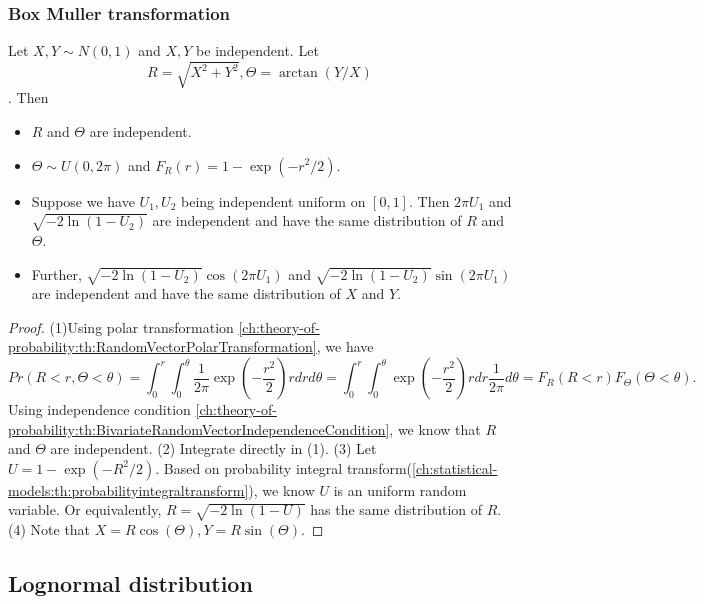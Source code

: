 \begin{refsection}
\subsubsection{Box Muller transformation}

\begin{lemma}\label{ch:theory-of-statistics:th:BoxMullerTransformation}
Let $X,Y\sim N(0,1)$ and $X,Y$ be independent. Let $$R=\sqrt{X^2+Y^2}, \Theta = \arctan(Y/X)$$. Then 
\begin{itemize}
	\item $R$ and $\Theta$ are independent.
	\item $\Theta \sim U(0,2\pi)$ and $F_R(r) = 1 - \exp(-r^2/2)$.
	\item Suppose we have $U_1,U_2$ being independent uniform on $[0,1]$. Then
	$2\pi U_1$ and $\sqrt{-2\ln(1-U_2)}$ are independent and have the same distribution of $R$ and $\Theta$.
	\item Further, $\sqrt{-2\ln(1-U_2)}\cos(2\pi U_1)$ and $\sqrt{-2\ln(1-U_2)}\sin(2\pi U_1)$ are independent and have the same distribution of $X$ and $Y$. 
\end{itemize}	
\end{lemma}
\begin{proof}
(1)Using polar transformation \autoref{ch:theory-of-probability:th:RandomVectorPolarTransformation}, we have
$$Pr(R<r,\Theta < \theta) = \int_0^r\int_0^{\theta} \frac{1}{2\pi} \exp(-\frac{r^2}{2})r drd\theta = \int_0^r\int_0^{\theta}  \exp(-\frac{r^2}{2})r dr \frac{1}{2\pi}d\theta = F_R(R<r)F_{\Theta}(\Theta<\theta).$$	
Using independence condition  \autoref{ch:theory-of-probability:th:BivariateRandomVectorIndependenceCondition}, we know that $R$ and $\Theta$ are independent.
(2) Integrate directly in (1). (3) Let $U=1 - \exp(-R^2/2)$.
Based on probability integral transform(\autoref{ch:statistical-models:th:probabilityintegraltransform}), we know $U$ is an uniform random variable. Or equivalently, $R = \sqrt{-2\ln(1-U)}$ has the same distribution of $R$.
(4) Note that $X = R\cos(\Theta),Y=R\sin(\Theta)$.
\end{proof}

\subsection{Lognormal distribution}

\end{refsection}
